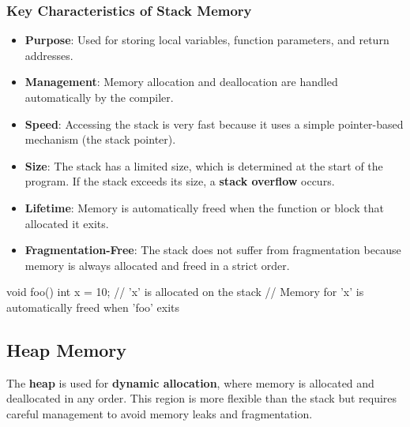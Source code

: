 \subsubsection{Key Characteristics of Stack Memory}
\begin{itemize}
    \item \textbf{Purpose}: Used for storing local variables, function parameters, and return addresses.
    \item \textbf{Management}: Memory allocation and deallocation are handled automatically by the compiler.
    \item \textbf{Speed}: Accessing the stack is very fast because it uses a simple pointer-based mechanism (the stack pointer).
    \item \textbf{Size}: The stack has a limited size, which is determined at the start of the program. If the stack exceeds its size, a \textbf{stack overflow} occurs.
    \item \textbf{Lifetime}: Memory is automatically freed when the function or block that allocated it exits.
    \item \textbf{Fragmentation-Free}: The stack does not suffer from fragmentation because memory is always allocated and freed in a strict order.
\end{itemize}


\begin{exampleblock}
    \begin{codeblock}[language=C++]
void foo() {
    int x = 10; // 'x' is allocated on the stack
    // Memory for 'x' is automatically freed when 'foo' exits
}
    \end{codeblock}
\end{exampleblock}

\subsection{Heap Memory}

The \textbf{heap} is used for \textbf{dynamic allocation}, where memory is allocated and deallocated in any order. This region is more flexible than the stack but requires careful management to avoid memory leaks and fragmentation.

